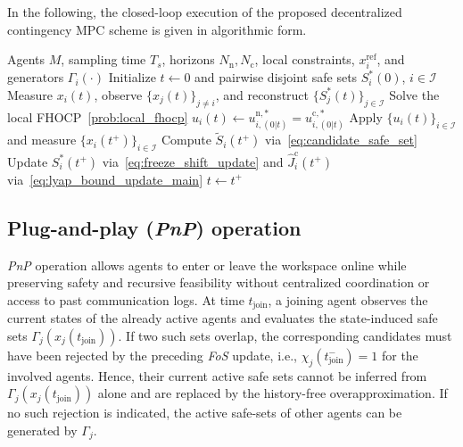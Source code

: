 \documentclass[twocolumn]{autart}
\begin{document}
In the following, the closed-loop execution of the proposed decentralized contingency MPC scheme is given in algorithmic form.
\begin{algorithm}[H]
\caption{Decentralized Contingency MPC with \textit{FoS} Safe Sets}
\label{alg:dcmpc_freeze_shift}
\begin{algorithmic}[1]
\Require Agents \(M\), sampling time \(T_s\), horizons \(N_{\mathrm n},N_{\mathrm c}\), local constraints, $x_i^{\mathrm{ref}}$, and generators \(\Gamma_i(\cdot)\)
\State Initialize \(t\gets0\) and pairwise disjoint safe sets \(S_i^\ast(0)\), \(i\in\mathcal I\)
        \State Measure \(x_i(t)\), observe \(\{x_j(t)\}_{j\neq i}\), and reconstruct \(\{S_j^\ast(t)\}_{j\in\mathcal I}\)
        \State Solve the local FHOCP~\eqref{prob:local_fhocp}
        \State \(u_i(t)\gets u^{\mathrm n,\ast}_{i,(0|t)}=u^{\mathrm c,\ast}_{i,(0|t)}\)
    \EndFor
    \State Apply \(\{u_i(t)\}_{i\in\mathcal I}\) and measure \(\{x_i(t^+)\}_{i\in\mathcal I}\)
        \State Compute \(\tilde S_i(t^+)\) via~\eqref{eq:candidate_safe_set}
        \State Update \(S_i^\ast(t^+)\) via~\eqref{eq:freeze_shift_update} and \(\hat J_i^{\mathrm c}(t^+)\) via~\eqref{eq:lyap_bound_update_main}
    \EndFor
    \State \(t\gets t^+\)
\EndWhile
\end{algorithmic}
\end{algorithm}
\subsection{Plug-and-play (\textit{PnP}) operation}
\label{subsec:plug_and_play}
\textit{PnP} operation allows agents to enter or leave the workspace online while preserving safety and recursive feasibility without centralized coordination or access to past communication logs. At time \(t_{\mathrm{join}}\), a joining agent observes the current states
of the already active agents and evaluates the state-induced safe sets
\(\Gamma_j(x_j(t_{\mathrm{join}}))\). If two such sets overlap, the
corresponding candidates must have been rejected by the preceding
\textit{FoS} update, i.e.,
\(\chi_j(t_{\mathrm{join}}^-)=1\) for the involved agents. Hence, their
current active safe sets cannot be inferred from
\(\Gamma_j(x_j(t_{\mathrm{join}}))\) alone and are replaced by the
history-free overapproximation. If no such rejection is indicated, the active safe-sets of other agents can be generated by \(\Gamma_j\).
\end{document}
